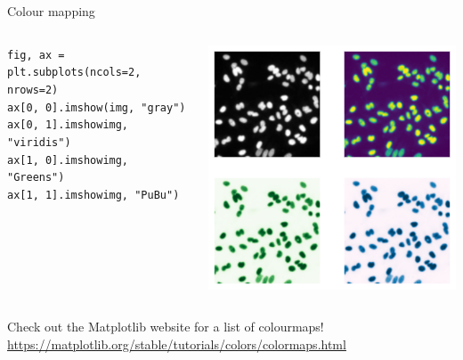 \documentclass[9pt, aspectratio=169]{beamer}
\begin{document}
\begin{frame}
    {Colour mapping}
    \begin{columns}
        \begin{column}{0.6\textwidth}
            \begin{codebox}
                \texttt{fig, ax = plt.subplots(ncols=2, nrows=2)\\
                    ax[0, 0].imshow(\texttt{img, "gray")\\
                    }                    ax[0, 1].imshow\texttt{img, "viridis")\\
                    }                    ax[1, 0].imshow\texttt{img, "Greens")\\
                    }                    ax[1, 1].imshow\texttt{img, "PuBu")}
                }            \end{codebox}
        \end{column}
        \begin{column}{0.4\textwidth}
            \includegraphics[width=\textwidth]{nuclei_cmapped.png}
        \end{column}
    \end{columns}
    \centering

    Check out the Matplotlib website for a list of colourmaps! \url{https://matplotlib.org/stable/tutorials/colors/colormaps.html}

\end{frame}
\end{document}
